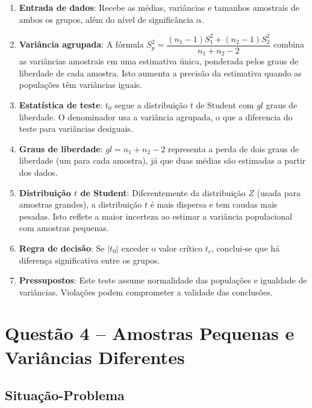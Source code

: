 \documentclass[12pt,a4paper]{article}
\begin{document}
\begin{enumerate}
  \item \textbf{Entrada de dados}: Recebe as médias, variâncias e tamanhos amostrais de ambos
  os grupos, além do nível de significância $\alpha$.

  \item \textbf{Variância agrupada}: A fórmula $S_p^2 = \dfrac{(n_1-1)S_1^2 + (n_2-1)S_2^2}{n_1+n_2-2}$
  combina as variâncias amostrais em uma estimativa única, ponderada pelos graus de liberdade de cada amostra.
  Isto aumenta a precisão da estimativa quando as populações têm variâncias iguais.

  \item \textbf{Estatística de teste}: $t_0$ segue a distribuição $t$ de Student com $gl$ graus de liberdade.
  O denominador usa a variância agrupada, o que a diferencia do teste para variâncias desiguais.

  \item \textbf{Graus de liberdade}: $gl = n_1 + n_2 - 2$ representa a perda de dois graus de liberdade
  (um para cada amostra), já que duas médias são estimadas a partir dos dados.

  \item \textbf{Distribuição $t$ de Student}: Diferentemente da distribuição $Z$ (usada para amostras grandes),
  a distribuição $t$ é mais dispersa e tem caudas mais pesadas. Isto reflete a maior incerteza ao estimar
  a variância populacional com amostras pequenas.

  \item \textbf{Regra de decisão}: Se $|t_0|$ exceder o valor crítico $t_c$, conclui-se que há diferença
  significativa entre os grupos.

  \item \textbf{Pressupostos}: Este teste assume normalidade das populações e igualdade de variâncias.
  Violações podem comprometer a validade das conclusões.
\end{enumerate}

\newpage

\section*{Questão 4 -- Amostras Pequenas e Variâncias Diferentes}

\subsection*{Situação-Problema}
\end{document}
